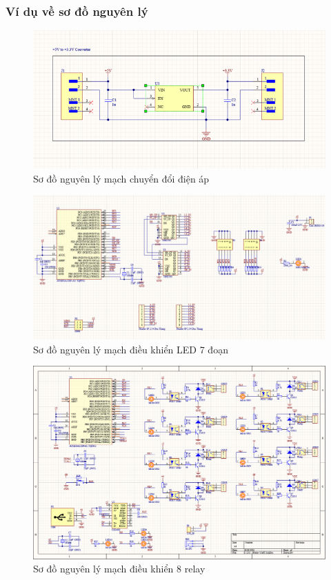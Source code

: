 \documentclass{article}
\begin{document}
\subsubsection{Ví dụ về sơ đồ nguyên lý}
\begin{figure}[H]
    \centering
    \includegraphics[width=1\textwidth]{image/sch1.png}
    \caption{Sơ đồ nguyên lý mạch chuyển đổi điện áp}
    \label{fig:sodonguyenly}
\end{figure}
\begin{figure}[H]
    \centering
    \includegraphics[width=1\textwidth]{image/sch2.png}
    \caption{Sơ đồ nguyên lý mạch điều khiển LED 7 đoạn}
    \label{fig:sodonguyenly}
\end{figure}
\begin{figure}[H]
    \centering
    \includegraphics[width=1\textwidth]{image/sch3.png}
    \caption{Sơ đồ nguyên lý mạch điều khiển 8 relay}
    \label{fig:sodonguyenly}
\end{figure}
\end{document}
